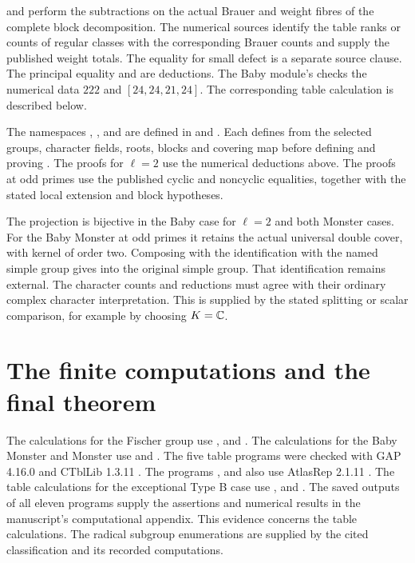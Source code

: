 \begin{implementation}
 and
 perform the
subtractions on the actual Brauer and weight fibres of the
complete block decomposition. The numerical sources
identify the table ranks or counts of regular classes with the
corresponding Brauer counts and supply the published weight
totals. The equality for small defect is a separate source clause.
The principal equality and  are deductions.
The Baby module's  checks the numerical
data $222$ and $[24,24,21,24]$. The corresponding table calculation is
described below.

The namespaces , ,
 and  are
defined in  and
. Each defines
 from the selected groups, character fields, roots,
blocks and covering map before defining  and proving
. The proofs for $\ell=2$ use the numerical deductions above. The proofs at odd primes use the published cyclic and
noncyclic equalities, together with the stated local extension and block
hypotheses.

The projection is bijective in the Baby case for $\ell=2$ and both Monster cases. For the Baby Monster at odd primes it retains the actual
universal double cover, with kernel of order two. Composing with
the identification with the named simple group gives  into the
original simple group. That identification remains external.
The character counts and reductions must agree with their ordinary
complex character interpretation. This is supplied by the stated
splitting or scalar comparison, for example by choosing $K=\mathbb C$.
\end{implementation}

\section{The finite computations and the final theorem}

The calculations for the Fischer group use ,  and . The calculations for the Baby Monster and Monster use  and .
The five table programs were checked with GAP 4.16.0 \cite{GAP2026}
and CTblLib 1.3.11 \cite{CTblLib2025}. The programs
,  and 
also use AtlasRep 2.1.11 \cite{AtlasRep2026}.
The table calculations for the exceptional Type B case use
\mbox{}, \mbox{} and \mbox{}.
The saved outputs of all eleven programs supply the assertions and numerical results in the
manuscript's computational appendix. This evidence concerns the table calculations. The radical subgroup
enumerations are supplied by the cited classification and its recorded
computations.

